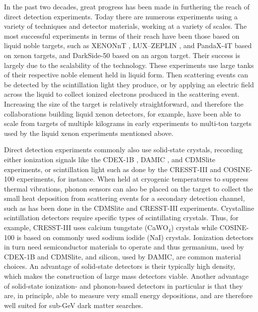 In the past two decades, great progress has been made in furthering the reach of direct detection experiments. Today there are numerous experiments using a variety of techniques and detector materials, working at a variety of scales. The most successful experiments in terms of their reach have been those based on liquid noble targets, such as XENONnT \parencite{XENONnT2023}, LUX--ZEPLIN \parencite{LZ2024}, and PandaX-4T \parencite{PandaX2021} based on xenon targets, and DarkSide-50 \parencite{DarkSide2023} based on an argon target. Their success is largely due to the scalability of the technology. These experiments use large tanks of their respective noble element held in liquid form. Then scattering events can be detected by the scintillation light they produce, or by applying an electric field across the liquid to collect ionized electrons produced in the scattering event. Increasing the size of the target is relatively straightforward, and therefore the collaborations building liquid xenon detectors, for example, have been able to scale from targets of multiple kilograms in early experiments to multi-ton targets used by the liquid xenon experiments mentioned above.

Direct detection experiments commonly also use solid-state crystals, recording either ionization signals like the CDEX-1B \parencite{CDEX2019}, DAMIC \parencite{DAMIC2020}, and CDMSlite \parencite{CDMSlite2018} experiments, or scintillation light such as done by the CRESST-III \parencite{CRESSTIII2019} and COSINE-100 \parencite{COSINE1002018} experiments, for instance. When held at cryogenic temperatures to suppress thermal vibrations, phonon sensors can also be placed on the target to collect the small heat deposition from scattering events for a secondary detection channel, such as has been done in the CDMSlite and CRESST-III experiments. Crystalline scintillation detectors require specific types of scintillating crystals. Thus, for example, CRESST-III uses calcium tungstate (CaWO$_4$) crystals while COSINE-100 is based on commonly used sodium iodide (NaI) crystals. Ionization detectors in turn need semiconductor materials to operate and thus germanium, used by CDEX-1B and CDMSlite, and silicon, used by DAMIC, are common material choices. An advantage of solid-state detectors is their typically high density, which makes the construction of large mass detectors viable. Another advantage of solid-state ionization- and phonon-based detectors in particular is that they are, in principle, able to measure very small energy depositions, and are therefore well suited for sub-GeV dark matter searches.

